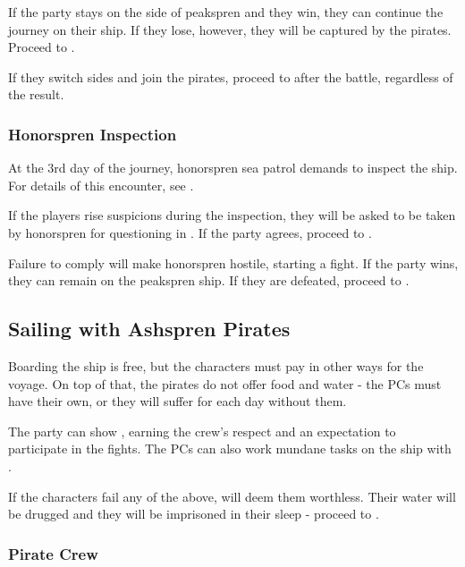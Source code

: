 If the party stays on the side of peakspren and they win, they can continue the journey on their ship. If they lose, however, they will be captured by the pirates. Proceed to .

If they switch sides and join the pirates, proceed to  after the battle, regardless of the result.

\subsubsection{Honorspren Inspection}

At the 3rd day of the journey, honorspren sea patrol demands to inspect the ship. For details of this encounter, see .

If the players rise suspicions during the inspection, they will be asked to be taken by honorspren for questioning in \locationFidelity{}. If the party agrees, proceed to .

Failure to comply will make honorspren hostile, starting a fight. If the party wins, they can remain on the peakspren ship. If they are defeated, proceed to .




\subsection{Sailing with Ashspren Pirates}
\label{ssec:sailingPirates}

Boarding the ship is free, but the characters must pay in other ways for the voyage. On top of that, the pirates do not offer food and water - the PCs must have their own, or they will suffer \exhausted[1] for each day without them.

The party can show \lootScadrialCoin{}, earning the crew's respect and an expectation to participate in the fights. The PCs can also work mundane tasks on the ship with .

If the characters fail any of the above, \npcCrypticCaptain{} will deem them worthless. Their water will be drugged and they will be imprisoned in their sleep - proceed to .

\subsubsection{Pirate Crew}

